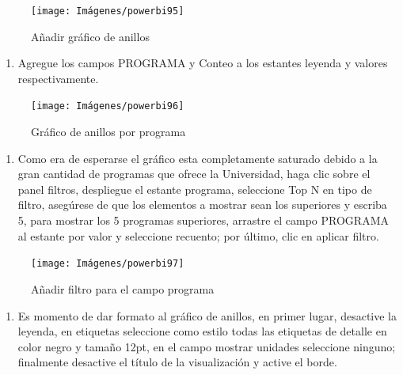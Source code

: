 \documentclass[
]{book}
\providecommand{\tightlist}{%
  \setlength{\itemsep}{0pt}\setlength{\parskip}{0pt}}
\begin{document}
\begin{figure}

{\centering \texttt{[image: Imágenes/powerbi95]} 

}

\caption{Añadir gráfico de anillos}\label{fig:paso1anillos-fig}
\end{figure}

\begin{enumerate}
\def\labelenumi{\arabic{enumi}.}
\setcounter{enumi}{1}
\tightlist
\item
  Agregue los campos PROGRAMA y Conteo a los estantes leyenda y valores respectivamente.
\end{enumerate}

\begin{figure}

{\centering \texttt{[image: Imágenes/powerbi96]} 

}

\caption{Gráfico de anillos por programa}\label{fig:paso2anillos-fig}
\end{figure}

\begin{enumerate}
\def\labelenumi{\arabic{enumi}.}
\setcounter{enumi}{2}
\tightlist
\item
  Como era de esperarse el gráfico esta completamente saturado debido a la gran cantidad de programas que ofrece la Universidad, haga clic sobre el panel filtros, despliegue el estante programa, seleccione Top N en tipo de filtro, asegúrese de que los elementos a mostrar sean los superiores y escriba 5, para mostrar los 5 programas superiores, arrastre el campo PROGRAMA al estante por valor y seleccione recuento; por último, clic en aplicar filtro.
\end{enumerate}

\begin{figure}

{\centering \texttt{[image: Imágenes/powerbi97]} 

}

\caption{Añadir filtro para el campo programa}\label{fig:paso3anillos-fig}
\end{figure}

\begin{enumerate}
\def\labelenumi{\arabic{enumi}.}
\setcounter{enumi}{3}
\tightlist
\item
  Es momento de dar formato al gráfico de anillos, en primer lugar, desactive la leyenda, en etiquetas seleccione como estilo todas las etiquetas de detalle en color negro y tamaño 12pt, en el campo mostrar unidades seleccione ninguno; finalmente desactive el título de la visualización y active el borde.
\end{enumerate}
\end{document}
